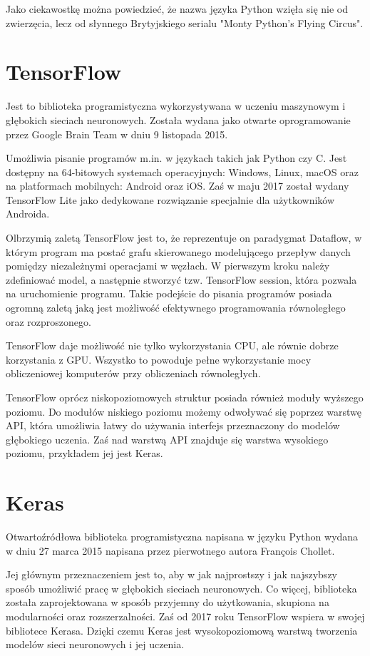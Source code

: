 \documentclass[a4paper,12pt,twoside,openany]{report}
\begin{document}
Jako ciekawostkę można powiedzieć, że nazwa języka Python wzięła się nie od zwierzęcia, lecz od słynnego Brytyjskiego serialu "Monty Python’s Flying Circus".

\section{TensorFlow}
Jest to biblioteka programistyczna wykorzystywana w uczeniu maszynowym i głębokich sieciach neuronowych. Została wydana jako otwarte oprogramowanie przez Google Brain Team w dniu 9 listopada 2015.

Umożliwia pisanie programów m.in. w językach takich jak Python czy C. Jest dostępny na 64-bitowych systemach operacyjnych: Windows, Linux, macOS oraz na platformach mobilnych: Android oraz iOS. Zaś w maju 2017 został wydany TensorFlow Lite jako dedykowane rozwiązanie specjalnie dla użytkowników Androida.

Olbrzymią zaletą TensorFlow jest to, że reprezentuje on paradygmat Dataflow, w którym program ma postać grafu skierowanego modelującego przepływ danych pomiędzy niezależnymi operacjami w węzłach. W pierwszym kroku należy zdefiniować model, a następnie stworzyć tzw. TensorFlow session, która pozwala na uruchomienie programu. Takie podejście do pisania programów posiada ogromną zaletą jaką jest możliwość efektywnego programowania równoległego oraz rozproszonego. 

TensorFlow daje możliwość nie tylko wykorzystania CPU, ale równie dobrze korzystania z GPU. Wszystko to powoduje pełne wykorzystanie mocy obliczeniowej komputerów przy obliczeniach równoległych.

TensorFlow oprócz niskopoziomowych struktur posiada również moduły wyższego poziomu. Do modułów niskiego poziomu możemy odwoływać się poprzez warstwę API, która umożliwia łatwy do używania interfejs przeznaczony do modelów głębokiego uczenia. Zaś nad warstwą API znajduje się warstwa wysokiego poziomu, przykładem jej jest Keras.

\section{Keras}
Otwartoźródłowa biblioteka programistyczna napisana w języku Python wydana w dniu 27 marca 2015 napisana przez pierwotnego autora François Chollet. 

Jej głównym przeznaczeniem jest to, aby w jak najprostszy i  jak najszybszy sposób umożliwić pracę w głębokich sieciach neuronowych. Co więcej, biblioteka została zaprojektowana w sposób przyjemny do użytkowania, skupiona na modularności oraz rozszerzalności. Zaś od 2017 roku TensorFlow wspiera w swojej bibliotece Kerasa. Dzięki czemu Keras jest wysokopoziomową warstwą tworzenia modelów sieci neuronowych i jej uczenia.
\end{document}
